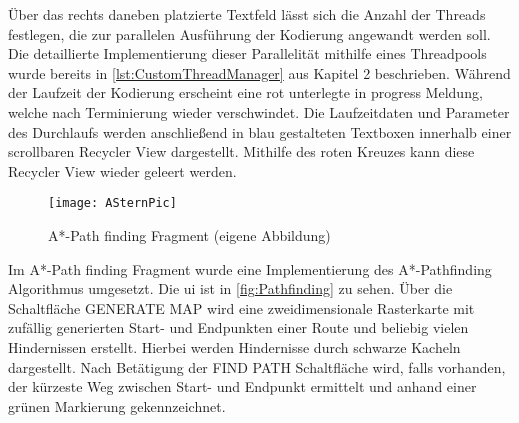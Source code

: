 Über das rechts daneben platzierte Textfeld lässt sich die Anzahl der Threads festlegen, die zur parallelen Ausführung der Kodierung angewandt werden soll. Die detaillierte Implementierung dieser Parallelität mithilfe eines Threadpools wurde bereits in \autoref{lst:CustomThreadManager} aus Kapitel 2 beschrieben. Während der Laufzeit der Kodierung erscheint eine rot unterlegte \glqq in progress\grqq{} Meldung, welche nach Terminierung wieder verschwindet. Die Laufzeitdaten und Parameter des Durchlaufs werden anschließend in blau gestalteten Textboxen innerhalb einer scrollbaren Recycler View dargestellt. Mithilfe des roten Kreuzes kann diese Recycler View wieder geleert werden.
\begin{figure}[H]
\begin{center}
	\texttt{[image: ASternPic]}
	\caption{A*-Path finding Fragment (eigene Abbildung)}
	\label{fig:Pathfinding} 
\end{center}
\end{figure}
Im A*-Path finding Fragment wurde eine Implementierung des A*-Pathfinding Algorithmus umgesetzt. Die \ac{ui} ist in \autoref{fig:Pathfinding} zu sehen. Über die Schaltfläche \glqq GENERATE MAP\grqq{} wird eine zweidimensionale Rasterkarte mit zufällig generierten Start- und Endpunkten einer Route und beliebig vielen Hindernissen erstellt. Hierbei werden Hindernisse durch schwarze Kacheln dargestellt. Nach Betätigung der \glqq FIND PATH\grqq{} Schaltfläche wird, falls vorhanden, der kürzeste Weg zwischen Start- und Endpunkt ermittelt und anhand einer grünen Markierung gekennzeichnet.

